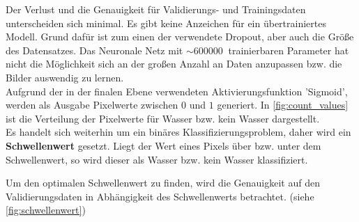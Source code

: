 Der Verlust und die Genauigkeit für Validierungs- und Trainingsdaten unterscheiden sich minimal.
Es gibt keine Anzeichen für ein übertrainiertes Modell.
Grund dafür ist zum einen der verwendete Dropout, aber auch die Größe des Datensatzes.
Das Neuronale Netz mit $\sim \SI{600000}{}$ trainierbaren Parameter hat nicht die Möglichkeit sich an der großen Anzahl an Daten anzupassen bzw. die Bilder auswendig zu lernen.
\\
Aufgrund der in der finalen Ebene verwendeten Aktivierungsfunktion 'Sigmoid', werden als Ausgabe Pixelwerte zwischen $0$ und $1$ generiert.
In \autoref{fig:count_values} ist die Verteilung der Pixelwerte für Wasser bzw. kein Wasser dargestellt.
\\
Es handelt sich weiterhin um ein binäres Klassifizierungsproblem, daher wird ein \textbf{Schwellenwert} gesetzt.
Liegt der Wert eines Pixels über bzw. unter dem Schwellenwert, so wird dieser als Wasser bzw. kein Wasser klassifiziert.

Um den optimalen Schwellenwert zu finden, wird die Genauigkeit auf den Validierungsdaten in Abhängigkeit des Schwellenwerts betrachtet. (siehe \autoref{fig:schwellenwert})

